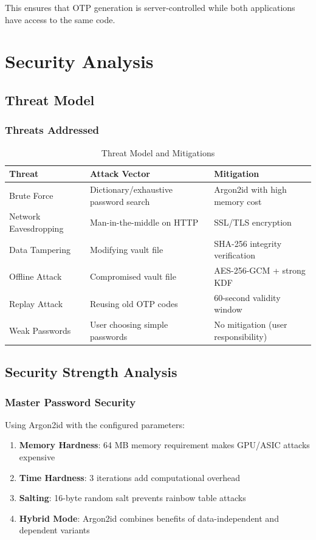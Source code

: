\documentclass[12pt,a4paper]{report}
\begin{document}
This ensures that OTP generation is server-controlled while both applications have access to the same code.

\chapter{Security Analysis}

\section{Threat Model}

\subsection{Threats Addressed}

\begin{table}[H]
\centering
\begin{tabular}{|p{3cm}|p{4cm}|p{4cm}|}
\hline
\textbf{Threat} & \textbf{Attack Vector} & \textbf{Mitigation} \\
\hline
Brute Force & Dictionary/exhaustive password search & Argon2id with high memory cost \\
Network Eavesdropping & Man-in-the-middle on HTTP & SSL/TLS encryption \\
Data Tampering & Modifying vault file & SHA-256 integrity verification \\
Offline Attack & Compromised vault file & AES-256-GCM + strong KDF \\
Replay Attack & Reusing old OTP codes & 60-second validity window \\
Weak Passwords & User choosing simple passwords & No mitigation (user responsibility) \\
\hline
\end{tabular}
\caption{Threat Model and Mitigations}
\end{table}

\section{Security Strength Analysis}

\subsection{Master Password Security}

Using Argon2id with the configured parameters:

\begin{enumerate}
    \item \textbf{Memory Hardness}: 64 MB memory requirement makes GPU/ASIC attacks expensive
    \item \textbf{Time Hardness}: 3 iterations add computational overhead
    \item \textbf{Salting}: 16-byte random salt prevents rainbow table attacks
    \item \textbf{Hybrid Mode}: Argon2id combines benefits of data-independent and dependent variants
\end{enumerate}
\end{document}
